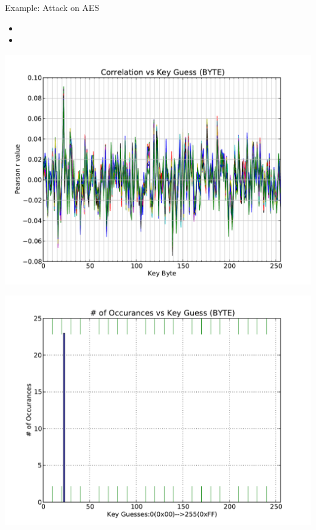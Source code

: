 \documentclass[final]{beamer}
\begin{document}
\begin{frame}[fragile]{}
\begin{columns}[t]
\begin{column}{.31\linewidth}
\begin{block}{Example: Attack on AES}
\begin{minipage}[t]{0.49\linewidth}
	 \end{minipage}%
	 \begin{minipage}[t]{0.49\linewidth}  
		 \vspace{-6cm}
		 \begin{itemize}
		  \item 
		  \item 
		 \end{itemize}
         \end{minipage} 
	 
        \begin{minipage}[t]{0.49\linewidth}
           \includegraphics[width=0.9\linewidth]{../figures/pearsonsCoActual}
        \end{minipage}%
        \begin{minipage}[t]{0.49\linewidth}  
		\includegraphics[width=0.9\linewidth]{../figures/histPearsonsCoActual}
        \end{minipage}
	

\end{block}
\end{column}
\end{columns}
\end{frame}
\end{document}
